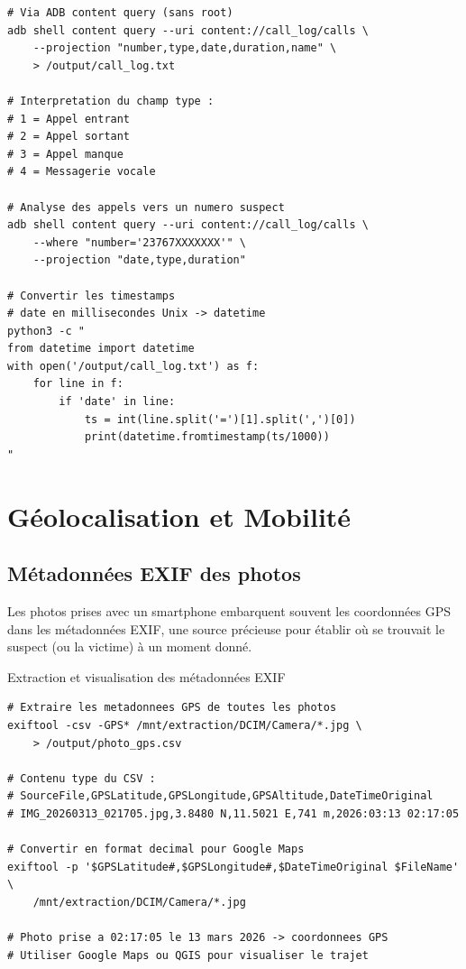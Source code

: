 \begin{lstlisting}[language=bash_forensique,
    caption={Extraction des journaux d'appels}]
# Via ADB content query (sans root)
adb shell content query --uri content://call_log/calls \
    --projection "number,type,date,duration,name" \
    > /output/call_log.txt

# Interpretation du champ type :
# 1 = Appel entrant
# 2 = Appel sortant
# 3 = Appel manque
# 4 = Messagerie vocale

# Analyse des appels vers un numero suspect
adb shell content query --uri content://call_log/calls \
    --where "number='23767XXXXXXX'" \
    --projection "date,type,duration"

# Convertir les timestamps
# date en millisecondes Unix -> datetime
python3 -c "
from datetime import datetime
with open('/output/call_log.txt') as f:
    for line in f:
        if 'date' in line:
            ts = int(line.split('=')[1].split(',')[0])
            print(datetime.fromtimestamp(ts/1000))
"
\end{lstlisting}

\section{Géolocalisation et Mobilité}
\label{sec:geolocalisation}

\subsection{Métadonnées EXIF des photos}

Les photos prises avec un smartphone embarquent souvent les coordonnées
GPS dans les métadonnées EXIF, une source précieuse pour établir
où se trouvait le suspect (ou la victime) à un moment donné.

\begin{boxoutils}{Extraction et visualisation des métadonnées EXIF}
\begin{lstlisting}[language=bash_forensique]
# Extraire les metadonnees GPS de toutes les photos
exiftool -csv -GPS* /mnt/extraction/DCIM/Camera/*.jpg \
    > /output/photo_gps.csv

# Contenu type du CSV :
# SourceFile,GPSLatitude,GPSLongitude,GPSAltitude,DateTimeOriginal
# IMG_20260313_021705.jpg,3.8480 N,11.5021 E,741 m,2026:03:13 02:17:05

# Convertir en format decimal pour Google Maps
exiftool -p '$GPSLatitude#,$GPSLongitude#,$DateTimeOriginal $FileName' \
    /mnt/extraction/DCIM/Camera/*.jpg

# Photo prise a 02:17:05 le 13 mars 2026 -> coordonnees GPS
# Utiliser Google Maps ou QGIS pour visualiser le trajet
\end{lstlisting}
\end{boxoutils}

